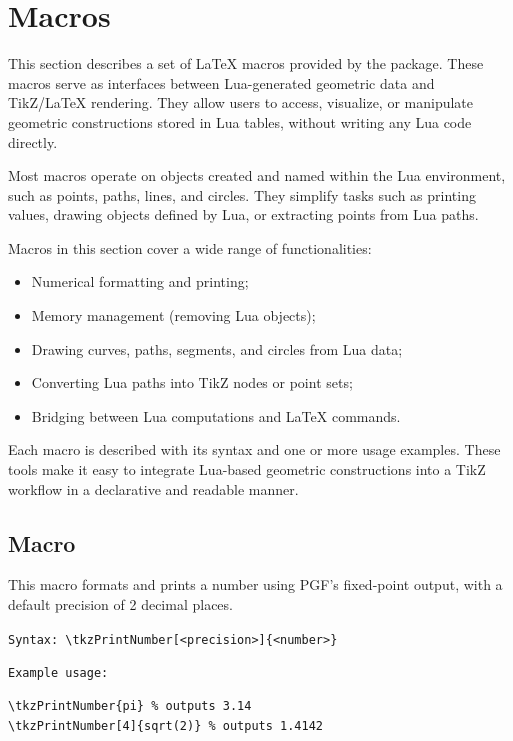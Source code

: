 \newpage
\section{Macros}

This section describes a set of LaTeX macros provided by the  package. These macros serve as interfaces between Lua-generated geometric data and TikZ/LaTeX rendering. They allow users to access, visualize, or manipulate geometric constructions stored in Lua tables, without writing any Lua code directly.

Most macros operate on objects created and named within the Lua environment, such as points, paths, lines, and circles. They simplify tasks such as printing values, drawing objects defined by Lua, or extracting points from Lua paths.

Macros in this section cover a wide range of functionalities:
\begin{itemize}
\item Numerical formatting and printing;
\item Memory management (removing Lua objects);
\item Drawing curves, paths, segments, and circles from Lua data;
\item Converting Lua paths into TikZ nodes or point sets;
\item Bridging between Lua computations and LaTeX commands.
\end{itemize}

Each macro is described with its syntax and one or more usage examples. These tools make it easy to integrate Lua-based geometric constructions into a TikZ workflow in a declarative and readable manner.


\subsection{Macro }
This macro formats and prints a number using PGF’s fixed-point output, with a default precision of 2 decimal places.

\medskip

\texttt{Syntax: }\verb|\tkzPrintNumber[<precision>]{<number>}|


\texttt{Example usage:}

\begin{mybox}
\begin{verbatim}
\tkzPrintNumber{pi} % outputs 3.14
\tkzPrintNumber[4]{sqrt(2)} % outputs 1.4142
\end{verbatim}
\end{mybox}

